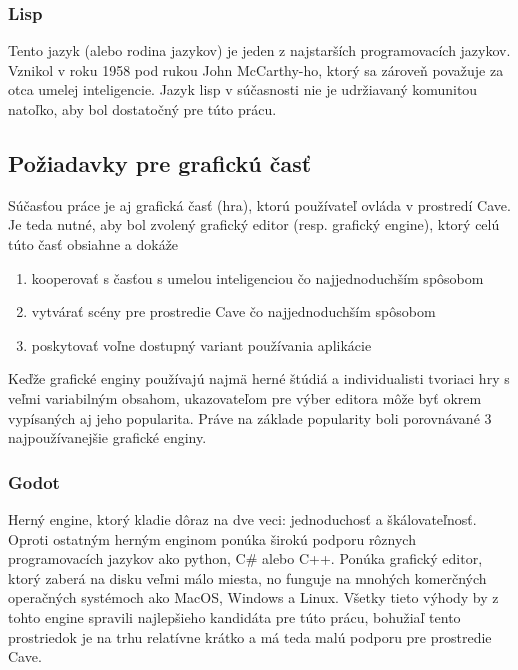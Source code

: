 \subsubsection{Lisp}

Tento jazyk (alebo rodina jazykov) je jeden z najstarších programovacích jazykov.
Vznikol v roku 1958 pod rukou John McCarthy-ho, ktorý sa zároveň považuje za otca umelej
inteligencie.\cite{father_of_ai}
Jazyk lisp v súčasnosti nie je udržiavaný komunitou natoľko, aby bol dostatočný pre túto prácu.

\subsection{Požiadavky pre grafickú časť}\label{subsec:requirements-game}

Súčasťou práce je aj grafická časť (hra), ktorú používateľ ovláda v prostredí Cave.
Je teda nutné, aby bol zvolený grafický editor (resp. grafický engine), ktorý celú túto časť obsiahne a dokáže
\begin{enumerate}
    \item kooperovať s časťou s umelou inteligenciou čo najjednoduchším spôsobom
    \item vytvárať scény pre prostredie Cave čo najjednoduchším spôsobom
    \item poskytovať voľne dostupný variant používania aplikácie
\end{enumerate}
Keďže grafické enginy používajú najmä herné štúdiá a individualisti tvoriaci hry s veľmi variabilným obsahom,
ukazovateľom pre výber editora môže byť okrem vypísaných aj jeho popularita.
Práve na základe popularity\cite{best_3d_game_engines} boli porovnávané 3 najpoužívanejšie grafické enginy.

\subsubsection{Godot}
Herný engine, ktorý kladie dôraz na dve veci: jednoduchosť a škálovateľnosť.\cite{game_engine_godot}
Oproti ostatným herným enginom ponúka širokú podporu rôznych programovacích jazykov ako python, C\# alebo C++.
Ponúka grafický editor, ktorý zaberá na disku veľmi málo miesta, no funguje na mnohých komerčných operačných systémoch
ako MacOS, Windows a Linux.
Všetky tieto výhody by z tohto engine spravili najlepšieho kandidáta pre túto prácu, bohužiaľ tento prostriedok je na
trhu relatívne krátko a má teda malú podporu pre prostredie Cave.

